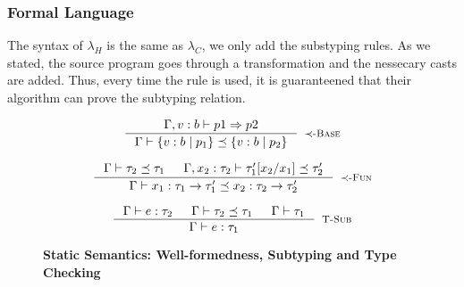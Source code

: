 \subsubsection{Formal Language}

The syntax of $\lambda_H$ is the same as $\lambda_C$, we only add the substyping rules.
As we stated, the source program goes through a transformation and the nessecary casts are added.
Thus, every time the \tsub rule is used, it is guaranteened that their algorithm can prove
the subtyping relation.

\begin{figure}[ht!]
\medskip {}

$$
\inference
   {\Gamma, v:b \vdash  p1 \Rightarrow p2 }
   {\isSubType{\Gamma}{\tref{b}{p_1}}{\tref{b}{p_2}}}
   [\tsubBase]
$$

$$
\inference
   {\isSubType{\Gamma}{\tau_2}{\tau_1} &
	\isSubType{\Gamma, x_2:{\tau_2}}{\SUBST{\tau_1'}{x_1}{x_2}}{\tau_2'}	
   }
   {\isSubType{\Gamma}
	  {\tfun{x_1}{\tau_1}{\tau_1'}}
	  {\tfun{x_2}{\tau_2}{\tau_2'}}
}[\tsubFun]
$$


\medskip {}

$$\begin{array}{cc}

\inference
  {  \hastype{\Gamma}{e}{\tau_2} && \isSubType{\Gamma}{\tau_2}{\tau_1} 
  && \isWellFormed{\Gamma}{\tau_1}
  }
  {\hastype{\Gamma}{e}{\tau_1}}
  [\tsub]
\end{array}$$

\caption{\textbf{Static Semantics: Well-formedness, Subtyping and Type Checking}}
\label{fig:rules}
\end{figure}

 
